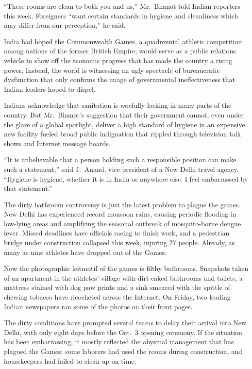 ﻿\documentclass[12pt]{article}
\begin{document}
``These rooms are clean to both you and us,'' Mr.~Bhanot told Indian reporters this week. Foreigners
``want certain standards in hygiene and cleanliness which may differ from our perception,'' he said.

India had hoped the Commonwealth Games, a quadrennial athletic competition among nations of the
former British Empire, would serve as a public relations vehicle to show off the economic progress
that has made the country a rising power. Instead, the world is witnessing an ugly spectacle of
bureaucratic dysfunction that only confirms the image of governmental ineffectiveness that Indian
leaders hoped to dispel.

Indians acknowledge that sanitation is woefully lacking in many parts of the country. But
Mr.~Bhanot's suggestion that their government cannot, even under the glare of a global spotlight,
deliver a high standard of hygiene in an expensive new facility fueled broad public indignation that
rippled through television talk shows and Internet message boards.

``It is unbelievable that a person holding such a responsible position can make such a statement,''
said J.~Anand, vice president of a New Delhi travel agency. ``Hygiene is hygiene, whether it is in
India or anywhere else. I feel embarrassed by that statement.''

The dirty bathroom controversy is just the latest problem to plague the games. New Delhi has
experienced record monsoon rains, causing periodic flooding in low-lying areas and amplifying the
seasonal outbreak of mosquito-borne dengue fever. Missed deadlines have officials racing to finish
work, and a pedestrian bridge under construction collapsed this week, injuring 27 people. Already,
as many as nine athletes have dropped out of the Games.

Now the photographic leitmotif of the games is filthy bathrooms. Snapshots taken of an apartment in
the athletes' village with dirt-caked bathrooms and toilets, a mattress stained with dog paw prints
and a sink smeared with the spittle of chewing tobacco have ricocheted across the Internet. On
Friday, two leading Indian newspapers ran some of the photos on their front pages.

The dirty conditions have prompted several teams to delay their arrival into New Delhi, with only
eight days before the Oct.~3 opening ceremony. If the situation has been embarrassing, it mostly
reflected the abysmal management that has plagued the Games; some laborers had used the rooms during
construction, and housekeepers had failed to clean up on time.
\end{document}
